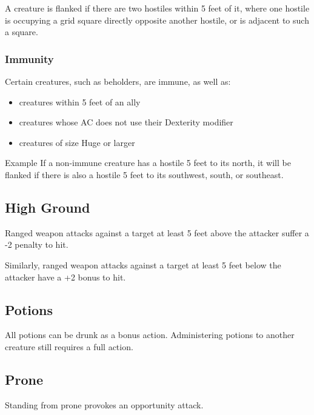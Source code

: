 \documentclass[House_Rules.tex]{subfiles}
\begin{document}
A creature is flanked if there are two hostiles within 5 feet of it, where one hostile is occupying a grid square directly opposite another hostile, or is adjacent to such a square.

\subsubsection{Immunity}
Certain creatures, such as beholders, are immune, as well as:
\begin{itemize}
    \item creatures within 5 feet of an ally
    \item creatures whose AC does not use their Dexterity modifier
    \item creatures of size Huge or larger
\end{itemize}

\begin{DndComment}{Example}
If a non-immune creature has a hostile 5 feet to its north, it will be flanked if there is also a hostile 5 feet to its southwest, south, or southeast.
\end{DndComment}

\subsection{High Ground}
Ranged weapon attacks against a target at least 5 feet above the attacker suffer a -2 penalty to hit.

Similarly, ranged weapon attacks against a target at least 5 feet below the attacker have a +2 bonus to hit.

\subsection{Potions}

All potions can be drunk as a bonus action. Administering potions to another creature still requires a full action.

\subsection{Prone}
Standing from prone provokes an opportunity attack.
\end{document}
